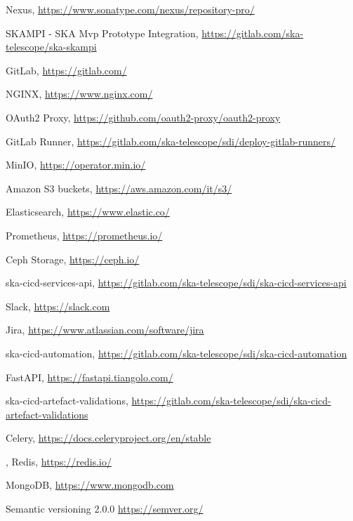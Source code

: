\documentclass[a4paper,
	       keeplastbox,   %
	       References
	       ]{jacow}
\begin{document}
{\begin{thebibliography}{99}
		Nexus,
		\url{https://www.sonatype.com/nexus/repository-pro/}
	
		SKAMPI - SKA Mvp Prototype Integration,
		\url{https://gitlab.com/ska-telescope/ska-skampi}
	
		GitLab,
		\url{https://gitlab.com/}
	
		NGINX,
		\url{https://www.nginx.com/}
	
		OAuth2 Proxy,
		\url{https://github.com/oauth2-proxy/oauth2-proxy}
	
	
		GitLab Runner,
		\url{https://gitlab.com/ska-telescope/sdi/deploy-gitlab-runners/}
	
		MinIO,
		\url{https://operator.min.io/}
	
		Amazon S3 buckets,
		\url{https://aws.amazon.com/it/s3/}
	
		Elasticsearch,
		\url{https://www.elastic.co/}
	
		Prometheus,
		\url{https://prometheus.io/}
	
		Ceph Storage,
		\url{https://ceph.io/}
	
		ska-cicd-services-api,
		\url{https://gitlab.com/ska-telescope/sdi/ska-cicd-services-api}
	
		Slack,
		\url{https://slack.com}
	
		Jira,
		\url{https://www.atlassian.com/software/jira}
	
		ska-cicd-automation,
		\url{https://gitlab.com/ska-telescope/sdi/ska-cicd-automation}
	
		FastAPI,
		\url{https://fastapi.tiangolo.com/}
	
		ska-cicd-artefact-validations,
		\url{https://gitlab.com/ska-telescope/sdi/ska-cicd-artefact-validations}
	
		Celery,
		\url{https://docs.celeryproject.org/en/stable}
	
	,
		Redis,
		\url{https://redis.io/}
	
		MongoDB,
		\url{https://www.mongodb.com}
	
		Semantic versioning 2.0.0
		\url{https://semver.org/}

	\end{thebibliography}
}
 
\end{document}
